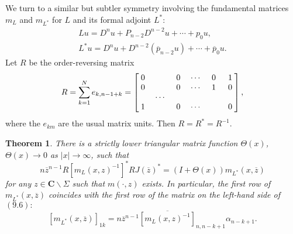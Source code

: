 \documentclass{surv-l}
\theoremstyle{plain}
\newtheorem{theorem}{Theorem}[section]
\theoremstyle{definition}
\numberwithin{equation}{chapter}
\begin{document}
We turn to a similar but subtler symmetry involving the fundamental matrices $m_{L}$ and $m_{L^{*}}$ for $L$ and its formal adjoint $L^{*}$:
\begin{align*}
Lu=D^{n}u + P_{n-2}D^{n-2}u +\cdots +p_{0}u,\\
L^{*}u=D^{n}u+D^{n-2}(\overline{p}_{n-2}u)+\cdots +\overline{p}_{0}u.
\end{align*}
Let $R$ be the order-reversing matrix
\begin{align*}
R = \sum_{k=1}^{N}e_{k,n-1+k}=
\left[\begin{array}{@{}cccccc@{}}
 0 & \quad & 0 & \cdots & 0 & 1\\
 0 & \quad & 0 & \cdots & 1 & 0\\
 \quad & \cdots & \quad & \quad & \quad & \quad\\
 1 & \quad & 0 & \cdots & \quad & 0\end{array}\right],
\end{align*}
where the $e_{km}$ are the usual matrix units. Then $R=R^{*}=R^{-1}$.

\setcounter{theorem}{4}
\begin{theorem}\label{thm9.5} There is a strictly lower triangular matrix function $\Theta(x)$,
$\Theta(x)\rightarrow 0$ as $|x|\rightarrow\infty$, such that
\setcounter{equation}{5}
\begin{equation}\label{eq9.6}
n\overline{z}^{n-1}R[m_{L}(x,z)^{-1}]^{*}RJ(\overline{z})^{*} = (I + \Theta(x))m_{L^{*}}(x,\overline{z})
\end{equation}
for any $ z\in \mathbf{C}\backslash \Sigma$ such that $m(\cdot, z)$ exists. In particular, the first row of $m_{L^{*}} (x,\overline{z})$ coincides with the first row of the matrix on the left-hand side of $\mathrm{(9.6)}:$
\begin{equation}\label{eq9.7}
[m_{L^{*}}(x,\overline{z})]_{1k} = n\overline{z}^{n-1}\overline{[m_{L}(x,z)^{-1}]}_{n,n-k+1}\alpha_{n-k+1}.
\end{equation}
\end{theorem}
\end{document}
